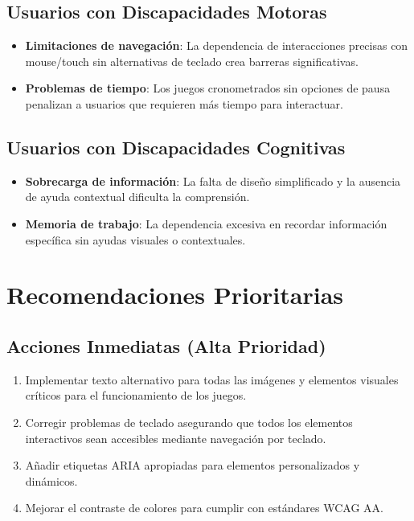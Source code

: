 \documentclass{article}
\begin{document}
	\subsection{Usuarios con Discapacidades Motoras}
	\begin{itemize}
		\item \textbf{Limitaciones de navegación}: La dependencia de interacciones precisas con mouse/touch sin alternativas de teclado crea barreras significativas.
		\item \textbf{Problemas de tiempo}: Los juegos cronometrados sin opciones de pausa penalizan a usuarios que requieren más tiempo para interactuar.
	\end{itemize}

	\subsection{Usuarios con Discapacidades Cognitivas}
	\begin{itemize}
		\item \textbf{Sobrecarga de información}: La falta de diseño simplificado y la ausencia de ayuda contextual dificulta la comprensión.
		\item \textbf{Memoria de trabajo}: La dependencia excesiva en recordar información específica sin ayudas visuales o contextuales.
	\end{itemize}

	\section{Recomendaciones Prioritarias}

	\subsection{Acciones Inmediatas (Alta Prioridad)}
	\noindent
	\begin{enumerate}
		\item Implementar texto alternativo para todas las imágenes y elementos visuales críticos para el funcionamiento de los juegos.
		\item Corregir problemas de teclado asegurando que todos los elementos interactivos sean accesibles mediante navegación por teclado.
		\item Añadir etiquetas ARIA apropiadas para elementos personalizados y dinámicos.
		\item Mejorar el contraste de colores para cumplir con estándares WCAG AA.
	\end{enumerate}
\end{document}

